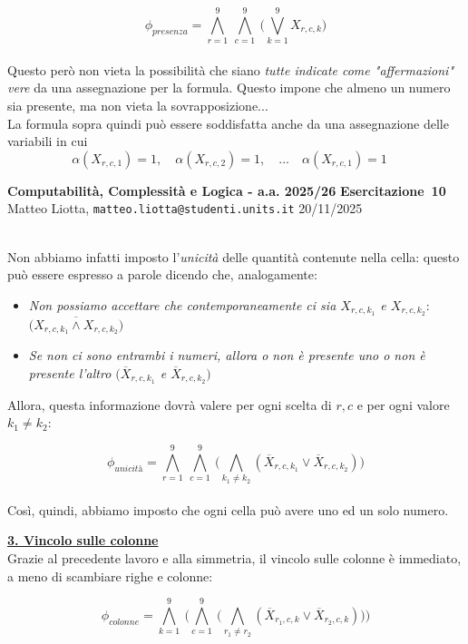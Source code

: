 \documentclass[a4paper,10pt]{article}
\makeatletter
\newcommand{\EsercitazioneNum}{10}
\newcommand{\Data}{20/11/2025}
\newcommand{\DocType}{Esercitazione} %
\newcommand{\FullTitle}{\DocType\ \EsercitazioneNum}
\newcommand{\Header}{
\noindent
  \small \textbf{Computabilità, Complessità e Logica - a.a. 2025/26} \hfill \textbf{\FullTitle} \\[0.2cm]
  \scriptsize Matteo Liotta, \texttt{matteo.liotta@studenti.units.it} \hfill \Data \\[0.2cm]
  \noindent\makebox[\linewidth]{\rule{\linewidth}{0.4pt}} \\[0.3cm]}
\newcommand{\NewPageHeader}{
  \vfill
  \noindent\makebox[\linewidth]{\rule{\linewidth}{0.4pt}}
  \newpage
  {\Header}
}
\makeatother
\begin{document}
{\begin{itemize}[label=, leftmargin=0pt]
\begin{osservazioni}
    $$\phi_{presenza}= \bigwedge\limits_{r=1}^{9}\ \bigwedge\limits_{c=1}^{9}\ \bigg( 
    \bigvee\limits_{k=1}^9 X_{r,c,k}
    \bigg)$$\\

Questo però non vieta la possibilità che siano \textit{tutte indicate come "affermazioni" vere} da una assegnazione per la formula. Questo impone che almeno un numero sia presente, ma non vieta la sovrapposizione...\\

La formula sopra quindi può essere soddisfatta anche da una assegnazione delle variabili in cui 
$$\alpha(X_{r,c,1})=1,\quad \alpha(X_{r,c,2})=1,\quad...\quad \alpha(X_{r,c,1})=1\quad$$

\end{osservazioni}
\NewPageHeader
\begin{osservazioni}

Non abbiamo infatti imposto l'\textit{unicità} delle quantità contenute nella cella: questo può essere espresso a parole dicendo che, analogamente:

\begin{itemize}
    \item \textit{Non possiamo accettare che contemporaneamente ci sia $X_{r,c,k_1}$ e $X_{r,c,k_2}$}: $\overline{\bigg(X_{r,c,k_1}\land X_{r,c,k_2}\bigg)}$
    \item \textit{Se non ci sono entrambi i numeri, allora o non è presente uno o non è presente l'altro $\bigg( \overline X_{r,c,k_1}$ e $\overline X_{r,c,k_2} \bigg)$}
\end{itemize}

Allora, questa informazione dovrà valere per ogni scelta di $r,c$ e per ogni valore $k_1\ne k_2$:

    $$\phi_{unicità}= \bigwedge\limits_{r=1}^{9}\ \bigwedge\limits_{c=1}^{9}\ \bigg( 
    \bigwedge\limits_{k_1\ne k_2} ( \overline X_{r,c,k_1} \lor\overline X_{r,c,k_2} )
    \bigg)$$\\

Così, quindi, abbiamo imposto che ogni cella può avere uno ed un solo numero.

\underline{\textbf{3. Vincolo sulle colonne}}\\
Grazie al precedente lavoro e alla simmetria, il vincolo sulle colonne è immediato, a meno di scambiare righe e colonne:

$$\phi_{colonne}= \bigwedge\limits_{k=1}^{9}\ \bigg(\bigwedge\limits_{c=1}^{9}\ \bigg( 
    \bigwedge\limits_{r_1\ne r_2} (\overline X_{r_1,c,k} \lor \overline X_{r_2,c,k})
    \bigg)\bigg)$$\\


\end{osservazioni}
\end{itemize}}
\end{document}
